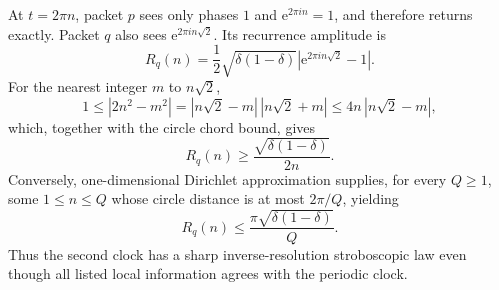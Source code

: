 \documentclass[10pt]{article}
\theoremstyle{definition}
\newcommand{\ee}{\mathrm e}
\begin{document}
At \(t=2\pi n\), packet \(p\) sees only phases \(1\) and
\(\ee^{2\pi in}=1\), and therefore returns exactly.  Packet \(q\) also sees
\(\ee^{2\pi in\sqrt2}\).  Its recurrence amplitude is
\[
 R_q(n)=\frac12\sqrt{\delta(1-\delta)}
 \left|\ee^{2\pi in\sqrt2}-1\right|.
\]
For the nearest integer \(m\) to \(n\sqrt2\),
\[
 1\leq|2n^2-m^2|
 =|n\sqrt2-m|\,|n\sqrt2+m|
 \leq4n\,|n\sqrt2-m|,
\]
which, together with the circle chord bound, gives
\[
 R_q(n)\geq\frac{\sqrt{\delta(1-\delta)}}{2n}.
\]
Conversely, one-dimensional Dirichlet approximation supplies, for every
\(Q\geq1\), some \(1\leq n\leq Q\) whose circle distance is at most
\(2\pi/Q\), yielding
\[
 R_q(n)\leq\frac{\pi\sqrt{\delta(1-\delta)}}{Q}.
\]
Thus the second clock has a sharp inverse-resolution stroboscopic law even
though all listed local information agrees with the periodic clock.
\end{document}
